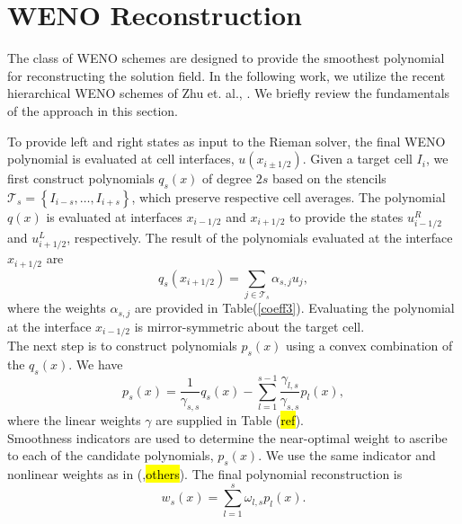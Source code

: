 \documentclass[]{article}
\begin{document}
    \section{WENO Reconstruction}


        The class of WENO schemes are designed to provide the smoothest
        polynomial for reconstructing the solution field. In the following work,
        we utilize the recent hierarchical WENO schemes of Zhu et. al.,
        \cite{zhu2018}. We briefly review the fundamentals of the approach in
        this section.

        To provide left and right states as input to the Rieman solver, the
        final WENO polynomial is evaluated at cell interfaces, $u(x_{i\pm1/2})$.
        Given a target cell $I_{i}$, we first construct polynomials $q_{s}(x)$
        of degree $2s$ based on the stencils $\mathcal{T}_{s} = \left\{ I_{i-s},
        \dots, I_{i+s} \right\}$, which preserve respective cell averages.  The
        polynomial $q(x)$ is evaluated at interfaces $x_{i-1/2}$ and $x_{i+1/2}$
        to provide the states $u_{i-1/2}^{R}$ and $u_{i+1/2}^{L}$, respectively.
        The result of the polynomials evaluated at the interface $x_{i+1/2}$ are
        \begin{equation}
            q_{s}(x_{i+1/2}) = \sum_{j \in \mathcal{T}_{s}} \alpha_{s,j} u_{j},
        \end{equation}
        where the weights $\alpha_{s,j}$ are provided in Table(\ref{coeff3}).
        Evaluating the polynomial at the interface $x_{i-1/2}$ is
        mirror-symmetric about the target cell. \\

        The next step is to construct polynomials $p_{s}(x)$ using a convex
        combination of the $q_{s}(x)$. We have
        \begin{equation}
            p_{s}(x) = \frac{1}{\gamma_{s,s}} q_{s}(x) - \sum_{l=1}^{s-1}
            \frac{\gamma_{l,s}}{\gamma_{s,s}} p_{l}(x),
        \end{equation}
        where the linear weights $\gamma$ are supplied in Table (\hl{ref}). \\

        Smoothness indicators are used to determine the near-optimal weight to
        ascribe to each of the candidate polynomials, $p_{s}(x)$. We use the
        same indicator and nonlinear weights as in (\cite{zhu2018},\hl{others}).
        The final polynomial reconstruction is 
        \begin{equation}
            w_{s}(x) = \sum_{l=1}^{s} \omega_{l,s} p_{l}(x).
        \end{equation}
 
\end{document}
